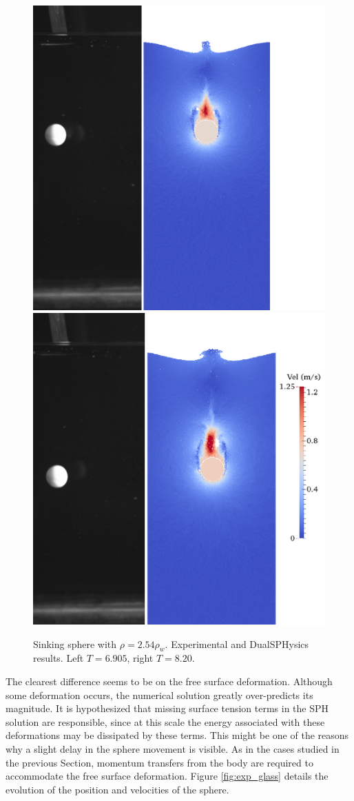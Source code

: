 %
\begin{figure}[ht!]
	\centering
	\includegraphics[width=0.48\linewidth]{Figures/5.Chapter/86-6_95_cut}
	\includegraphics[width=0.48\linewidth]{Figures/5.Chapter/102-8_25_cut}
	\caption{Sinking sphere with $\rho=2.54\rho_{w}$. Experimental and DualSPHysics results. Left $T=6.905$, right $T=8.20$.}
	\label{fig:exp_glass_figs} 
\end{figure}
%
The clearest difference seems to be on the free surface deformation. Although some deformation occurs, the numerical solution greatly over-predicts its magnitude. It is hypothesized that missing surface tension terms in the \ac{SPH} solution are responsible, since at this scale the energy associated with these deformations may be dissipated by these terms. This might be one of the reasons why a slight delay in the sphere movement is visible. As in the cases studied in the previous Section, momentum transfers from the body are required to accommodate the free surface deformation.
Figure \ref{fig:exp_glass} details the evolution of the position and velocities of the sphere.

